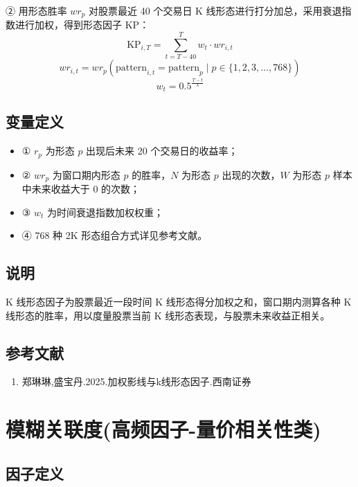 \documentclass{article}
\begin{document}
② 用形态胜率 \( wr_p \) 对股票最近 40 个交易日 K 线形态进行打分加总，采用衰退指数进行加权，得到形态因子 \( \mathrm{KP} \)：
\begin{equation}
    \mathrm{KP}_{i,T} = \sum_{t=T-40}^{T} w_t \cdot wr_{i,t}
\end{equation}
\begin{equation}
    wr_{i,t} = wr_p(\mathrm{pattern}_{i,t} = \mathrm{pattern}_p \mid p \in \{1,2,3,\ldots,768\})
\end{equation}
\begin{equation}
    w_t = 0.5^{\frac{T-t}{\lambda}}
\end{equation}

\subsection{变量定义}
\begin{itemize}
    \item ① \( r_p \) 为形态 \( p \) 出现后未来 20 个交易日的收益率；
    \item ② \( wr_p \) 为窗口期内形态 \( p \) 的胜率，\( N \) 为形态 \( p \) 出现的次数，\( W \) 为形态 \( p \) 样本中未来收益大于 0 的次数；
    \item ③ \( w_t \) 为时间衰退指数加权权重；
    \item ④ 768 种 2K 形态组合方式详见参考文献。
\end{itemize}

\subsection{说明}
K 线形态因子为股票最近一段时间 K 线形态得分加权之和，窗口期内测算各种 K 线形态的胜率，用以度量股票当前 K 线形态表现，与股票未来收益正相关。

\subsection{参考文献}
\begin{enumerate}
    \item 郑琳琳,盛宝丹.2025.加权影线与k线形态因子.西南证券
\end{enumerate}

\section{模糊关联度(高频因子-量价相关性类)}

\subsection{因子定义}
\end{document}
